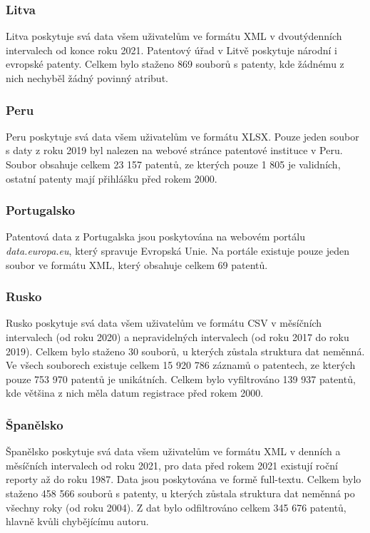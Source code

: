 \subsubsection{Litva}
Litva poskytuje svá data všem uživatelům ve formátu \gls{XML} v dvoutýdenních intervalech od konce roku 2021. Patentový úřad v Litvě poskytuje národní i evropské patenty. Celkem bylo staženo 869 souborů s patenty, kde žádnému z nich nechyběl žádný povinný atribut.

\subsubsection{Peru}
Peru poskytuje svá data všem uživatelům ve formátu XLSX. Pouze jeden soubor s daty z roku 2019 byl nalezen na webové stránce patentové instituce v Peru. Soubor obsahuje celkem 23 157 patentů, ze kterých pouze 1 805 je validních, ostatní patenty mají přihlášku před rokem 2000.

\subsubsection{Portugalsko}
Patentová data z Portugalska jsou poskytována na webovém portálu \textit{data.europa.eu}, který spravuje Evropská Unie. Na portále existuje pouze jeden soubor ve formátu \gls{XML}, který obsahuje celkem 69 patentů.

\subsubsection{Rusko}
Rusko poskytuje svá data všem uživatelům ve formátu \gls{CSV} v měsíčních intervalech (od roku 2020) a nepravidelných intervalech (od roku 2017 do roku 2019).
\newline
\indent Celkem bylo staženo 30 souborů, u kterých zůstala struktura dat neměnná. Ve všech souborech existuje celkem 15 920 786 záznamů o patentech, ze kterých pouze 753 970 patentů je unikátních. Celkem bylo vyfiltrováno 139 937 patentů, kde většina z nich měla datum registrace před rokem 2000.

\subsubsection{Španělsko}
Španělsko poskytuje svá data všem uživatelům ve formátu \gls{XML} v denních a měsíčních intervalech od roku 2021, pro data před rokem 2021 existují roční reporty až do roku 1987. Data jsou poskytována ve formě full-textu.
\newline
\indent Celkem bylo staženo 458 566 souborů s patenty, u kterých zůstala struktura dat neměnná po všechny roky (od roku 2004). Z dat bylo odfiltrováno celkem 345 676 patentů, hlavně kvůli chybějícímu autoru.

